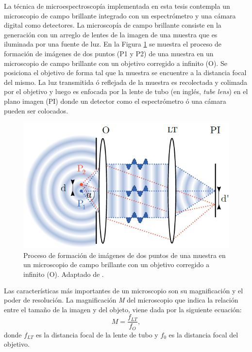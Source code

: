 La técnica de microespectroscopía implementada en esta tesis contempla un microscopio de campo brillante integrado con un espectrómetro y una cámara digital como detectores. La microscopía de campo brillante consiste en la generación con un arreglo de lentes de la imagen de una muestra que es iluminada por una fuente de luz. En la Figura \ref{fig:mdb} se muestra el proceso de formación de imágenes de dos puntos (P1 y P2) de una muestra en un microscopio de campo brillante con un objetivo corregido a infinito (O). Se posiciona el objetivo de forma tal que la muestra se encuentre a la distancia focal del mismo. La luz transmitida ó reflejada de la muestra es recolectada y colimada por el objetivo y luego es enfocada por la lente de tubo (en inglés, \textit{tube lens}) en el plano imagen (PI) donde un detector como el espectrómetro ó una cámara pueden ser colocados.

\begin{figure}
	\centering
	\includegraphics[width=1.0\textwidth]{Figs/introduccion/martinbordenave.png}
	\caption{Proceso de formación de imágenes de dos puntos de una muestra en un microscopio de campo brillante con un objetivo corregido a infinito (O). Adaptado de \cite{borden}.}
	\label{fig:mdb}
\end{figure}

Las características más importantes de un microscopio son su magnificación y el poder de resolución. La magnificación \textit{M} del microscopio que indica la relación entre el tamaño de la imagen y del objeto, viene dada por la siguiente ecuación:
\begin{equation}
M = \frac{f_{LT}}{f_{O}},
\end{equation}	
donde $f_{LT}$ es la distancia focal de la lente de tubo y $f_{0}$ es la distancia focal del objetivo.

